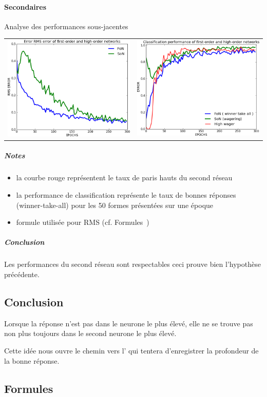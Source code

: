     \paragraph{Secondaires}
      Analyse des performances sous-jacentes
      \begin{center}
	\begin{tabular}{lr}
	  \hspace*{-1cm}
	  \includegraphics[width=250px]{data/expD1/rms.png}
	  &
	  \includegraphics[width=250px]{data/expD1/perf.png} 
	\end{tabular}
      \end{center} 
      \subparagraph{Notes}
	\begin{itemize}
	  \item la courbe rouge représentent le taux de paris hauts du second réseau
	  \item la performance de classification représente le taux de bonnes réponses (winner-take-all) pour les 50 formes présentées sur une époque
	  \item formule utilisée pour RMS (cf. Formules~)
	\end{itemize}
      \subparagraph{Conclusion}
	Les performances du second réseau sont respectables ceci prouve bien l'hypothèse précédente.


  \subsection{Conclusion}
  Lorsque la réponse n'est pas dans le neurone le plus élevé, elle ne se trouve pas non plus toujours 
  dans le second neurone le plus élevé.
  
  
  Cette idée nous ouvre le chemin vers l' qui tentera d'enregistrer la profondeur de la bonne réponse.
  \newpage 
  \subsection{Formules}
    
    
    
    


